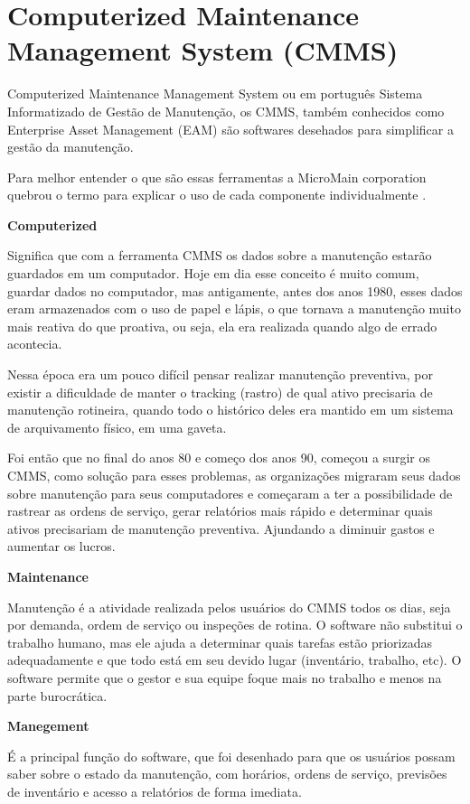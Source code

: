 \chapter{Computerized Maintenance Management System (CMMS)}
\label{cmms}

Computerized Maintenance Management System ou em português Sistema Informatizado de Gestão de Manutenção, os CMMS, também conhecidos como Enterprise Asset Management (EAM) são softwares desehados para simplificar a gestão da manutenção.

Para melhor entender o que são essas ferramentas a MicroMain corporation quebrou o termo para explicar o uso de cada componente individualmente \cite{micromain}.

\textbf{Computerized}

Significa que com a ferramenta CMMS os dados sobre a manutenção estarão guardados em um computador. Hoje em dia esse conceito é muito comum, guardar dados no computador, mas antigamente, antes dos anos 1980, esses dados eram armazenados com o uso de papel e lápis, o que tornava a manutenção muito mais reativa do que proativa, ou seja, ela era realizada quando algo de errado acontecia. 

Nessa época era um pouco difícil pensar realizar manutenção preventiva, por existir a dificuldade de manter o tracking (rastro) de qual ativo precisaria de manutenção rotineira, quando todo o histórico deles era mantido em um sistema de arquivamento físico, em uma gaveta. 

Foi então que no final do anos 80 e começo dos anos 90, começou a surgir os CMMS, como solução para esses problemas, as organizações migraram seus dados sobre manutenção para seus computadores e começaram a ter a possibilidade de rastrear as ordens de serviço, gerar relatórios mais rápido e determinar quais ativos precisariam de manutenção preventiva. Ajundando a diminuir gastos e aumentar os lucros. 

\textbf{Maintenance}

Manutenção é a atividade realizada pelos usuários do CMMS todos os dias, seja por demanda, ordem de serviço ou inspeções de rotina. O software não substitui o trabalho humano, mas ele ajuda a determinar quais tarefas estão priorizadas adequadamente e que todo está em seu devido lugar (inventário, trabalho, etc). O software permite que o gestor e sua equipe foque mais no trabalho e menos na parte burocrática. 

\textbf{Manegement}

É a principal função do software, que foi desenhado para que os usuários possam saber sobre o estado da manutenção, com horários, ordens de serviço, previsões de inventário e acesso a relatórios de forma imediata. 

